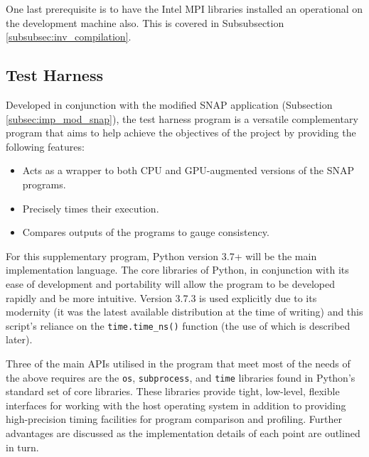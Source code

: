 \documentclass[conference]{IEEEtran}
\begin{document}
One last prerequisite is to have the Intel MPI libraries installed an operational on the development machine also. This is covered in Subsubsection \ref{subsubsec:inv_compilation}.


\subsection{Test Harness}
\label{subsec:imp_testharness}

Developed in conjunction with the modified SNAP application (Subsection \ref{subsec:imp_mod_snap}), the test harness program is a versatile complementary program that aims to help achieve the objectives of the project by providing the following features:

\begin{itemize}
    \item Acts as a wrapper to both CPU and GPU-augmented versions of the SNAP programs.
    \item Precisely times their execution.
    \item Compares outputs of the programs to gauge consistency.
\end{itemize}

For this supplementary program, Python version 3.7+ will be the main implementation language. The core libraries of Python, in conjunction with its ease of development and portability will allow the program to be developed rapidly and be more intuitive. Version 3.7.3 is used explicitly due to its modernity (it was the latest available distribution at the time of writing) and this script's reliance on the \texttt{time.time\_ns()} function (the use of which is described later).

Three of the main APIs utilised in the program that meet most of the needs of the above requires are the \texttt{os}, \texttt{subprocess}, and \texttt{time} libraries found in Python's standard set of core libraries. These libraries provide tight, low-level, flexible interfaces for working with the host operating system in addition to providing high-precision timing facilities for program comparison and profiling. Further advantages are discussed as the implementation details of each point are outlined in turn.
\end{document}
